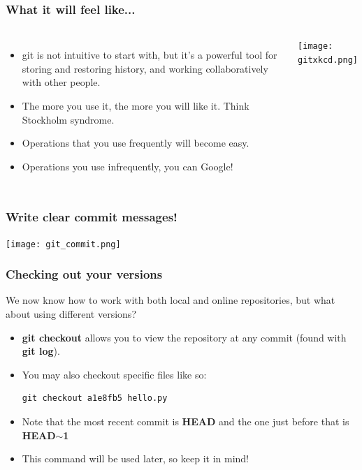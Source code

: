 \documentclass{beamer}
\begin{document}
\begin{frame}
\frametitle{What it will feel like...}
\begin{columns}
\begin{itemize}
\item git is not intuitive to start with, but it's %
a powerful tool for storing and restoring history, and working collaboratively with other people.
\item The more you use it, the more you will like it. Think Stockholm syndrome.
\item Operations that you use frequently will become easy.
\item Operations you use infrequently, you can Google!
\end{itemize}
\texttt{[image: gitxkcd.png]}
\end{columns}
\end{frame}


\begin{frame}[fragile]
\frametitle{Write clear commit messages!}
\texttt{[image: git\_commit.png]}
\end{frame}

\begin{frame}[fragile]
\frametitle{Checking out your versions}
We now know how to work with both local and online repositories, but what about using different versions?
\begin{itemize}
\item \textbf{git checkout} allows you to view the repository at any commit (found with \textbf{git log}).
\item You may also checkout specific files like so: 
        \begin{lstlisting}
git checkout a1e8fb5 hello.py
        \end{lstlisting}
\item Note that the most recent commit is \textbf{HEAD} and the one just before that is \textbf{HEAD$\mathbf{\sim}$1}
\item This command will be used later, so keep it in mind! 
\end{itemize}
\end{frame}
\end{document}
